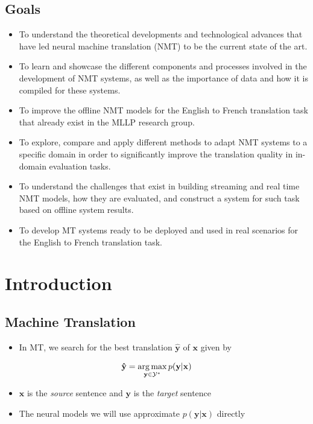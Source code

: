 \documentclass[landscape]{article}
\begin{document}
\subsection*{Goals}
\vspace*{5mm}
 \begin{itemize}\itemsep=5mm
     \item To understand the theoretical developments and technological advances that have led neural machine translation (NMT) to be the current state of the art.
    \item To learn and showcase the different components and processes involved in the development of NMT systems, as well as the importance of data and how it is compiled for these systems.
    \item To improve the offline NMT models for the English to French translation task that already exist in the MLLP research group.
    \item To explore, compare and apply different methods to adapt NMT systems to a specific domain in order to significantly improve the translation quality in in-domain evaluation tasks.
    \item To understand the challenges that exist in building streaming and real time NMT models, how they are evaluated, and construct a system for such task based on offline system results.
    \item To develop MT systems ready to be deployed and used in real scenarios for the English to French translation task.
\end{itemize}


\cp
\section*{Introduction}
\vspace*{10mm}
\subsection*{Machine Translation}
\vspace{5mm}
\begin{itemize}
	\item In MT, we search for the best translation $\mathbf{\hat{y}}$ of $\mathbf{x}$ given by
\end{itemize}
\vspace{5mm}
\begin{equation}\nonumber
	\mathbf{\hat{y}}=\operatorname*{arg\,max}_{\mathbf{y} \in \mathcal{Y^*}} p(\mathbf{y}|\mathbf{x})
\end{equation}
\vspace*{5mm}
\begin{itemize}\itemsep=5mm
	\item $\mathbf{x}$ is the \textit{source} sentence and $\mathbf{y}$ is the \textit{target} sentence
	\item The neural models we will use approximate $p(\mathbf{y}|\mathbf{x})$ directly
\end{itemize}
\end{document}
